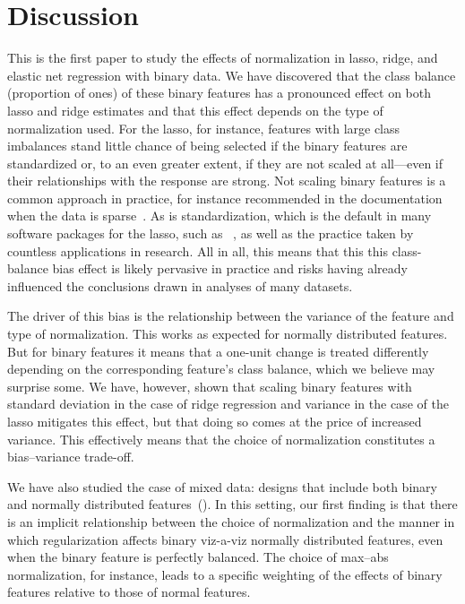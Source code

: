 \section{Discussion}


This is the first paper to study the effects of normalization in lasso, ridge, and elastic
net regression with binary data. We have discovered that the class balance (proportion of
ones) of these binary features has a pronounced effect on both lasso and ridge estimates
and that this effect depends on the type of normalization used. For the lasso, for
instance, features with large class imbalances stand little chance of being selected if the
binary features are standardized or, to an even greater extent, if they are not scaled at
all---even if their relationships with the response are strong. Not scaling binary features
is a common approach in practice, for instance recommended in the 
documentation when the data is sparse~\citep{scikit-learndevelopers2025}. As is
standardization, which is the default in many software packages for the lasso, such as
~\citep{friedman2010}, as well as the practice taken by countless applications
in research. All in all, this means that this this class-balance bias effect is likely
pervasive in practice and risks having already influenced the conclusions drawn in analyses
of many datasets.

The driver of this bias is the relationship between the variance of the feature and type of
normalization. This works as expected for normally distributed features. But for binary
features it means that a one-unit change is treated differently depending on the
corresponding feature's class balance, which we believe may surprise some. We have,
however, shown that scaling binary features with standard deviation in the case of ridge
regression and variance in the case of the lasso mitigates this effect, but that doing so
comes at the price of increased variance. This effectively means that the choice of
normalization constitutes a bias--variance trade-off.

We have also studied the case of mixed data: designs that include both binary and normally
distributed features~(). In this setting, our first finding is that
there is an implicit relationship between the choice of normalization and the manner in
which regularization affects binary viz-a-viz normally distributed features, even when the
binary feature is perfectly balanced. The choice of max--abs normalization, for instance,
leads to a specific weighting of the effects of binary features relative to those of normal
features.


